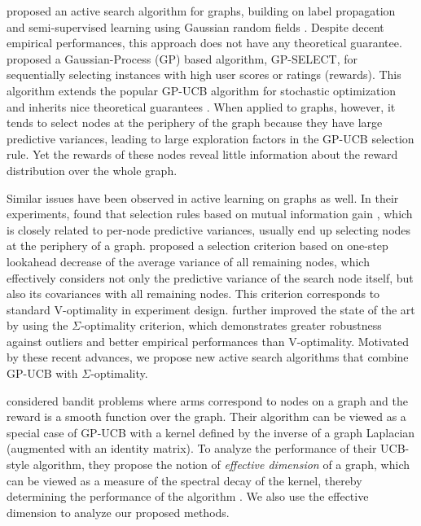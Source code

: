 \cite{wang2013active} proposed an active search algorithm for graphs, building on label propagation and semi-supervised 
learning using Gaussian random fields \citep{zhu2003semi,zhu2003combining}. Despite decent empirical performances, this approach does not have any theoretical guarantee.
\cite{vanchinathanadaptively} proposed a Gaussian-Process (GP) based algorithm, 
GP-SELECT, for sequentially selecting instances with high user scores or ratings (rewards).   
This algorithm extends the popular GP-UCB algorithm \citep{cox1997sdo,auer2003using} for stochastic optimization and 
inherits nice theoretical guarantees \citep{srinivas2012information}. 
When applied to graphs, however, it tends to select nodes at the periphery of the graph because they have 
large predictive variances, leading to large exploration factors in the GP-UCB selection rule.
Yet the rewards of these nodes 
reveal little information about the reward distribution over the whole graph. 

Similar issues have been observed in active learning on graphs as well. 
In their experiments, \cite{ma_2013} found that
selection rules based on mutual information gain \citep{MIG}, which is closely related to 
per-node predictive variances, usually end up selecting nodes at the periphery of a graph.
\cite{mingji} proposed a selection criterion based on one-step lookahead decrease of the average variance of all remaining nodes, which effectively considers not only the predictive variance of the search node itself,
but also its covariances with all remaining nodes. 
This criterion corresponds to standard V-optimality 
in experiment design. \cite{ma_2013} further improved the state of the art by using 
the $\Sigma$-optimality criterion, which demonstrates greater robustness against outliers and 
better empirical performances than V-optimality. Motivated by these recent advances, we propose 
new active search algorithms that combine GP-UCB with $\Sigma$-optimality.

\cite{valko2014spectral} considered bandit problems where arms correspond to nodes on a graph
and the reward is a smooth function over the graph. Their algorithm can be viewed as a special 
case of GP-UCB with a kernel defined by the inverse of a graph Laplacian (augmented with an identity matrix).
To analyze the performance of their UCB-style algorithm, they propose the notion of 
\textit{effective dimension} of a graph, which can be viewed as a measure of the spectral decay  
of the kernel, thereby determining the performance of the algorithm \citep{srinivas2012information}.
We also use the effective dimension to analyze our proposed methods.

